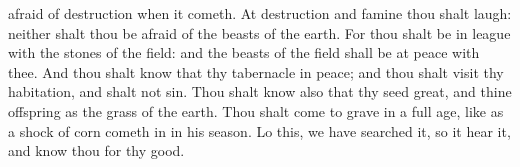 {afraid of
destruction when it
cometh.
At
destruction and
famine thou shalt
laugh: neither shalt thou be
afraid of the
beasts of the
earth.
For thou shalt be in
league with the
stones of the
field: and the
beasts of the
field shall be at
peace with thee.
And thou shalt
know that thy
tabernacle
{} in
peace; and thou shalt
visit thy
habitation, and shalt not
sin.
Thou shalt
know also that thy
seed
{}
great, and thine
offspring as the
grass of the
earth.
Thou shalt
come to
{}
grave in a full
age, like as a shock of
corn cometh
in in his
season.
Lo this, we have
searched it, so it
{}
hear it, and
know thou
{} for thy good.

}

